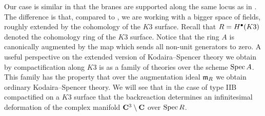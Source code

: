\documentclass[../main.tex]{subfiles}
\begin{document}
Our case is similar in that the branes are supported along the same locus as in \cite{CostelloGaiotto, CP}.
The difference is that, compared to \cite{CostelloGaiotto}, we are working with a bigger space of fields, roughly extended by the cohomology of the $K3$ surface.
Recall that $R = H^{\bullet}(K3)$ denoted the cohomology ring of the $K3$ surface.
Notice that the ring $A$ is canonically augmented by the map which sends all non-unit generators to zero. %
A useful perspective on the extended version of Kodaira--Spencer theory we obtain by compactification along $K3$ is as a family of theories over the scheme $\operatorname{Spec} A$.
This family has the property that over the augmentation ideal $\mathfrak{m}_R$ we obtain ordinary Kodaira--Spencer theory.
We will see that in the case of type IIB compactified on a $K3$ surface that the backreaction determines an infinitesimal deformation of the complex manifold $\mathbf{C}^3 \setminus \mathbf{C}$ over $\operatorname{Spec} R$. 
 
\end{document}
